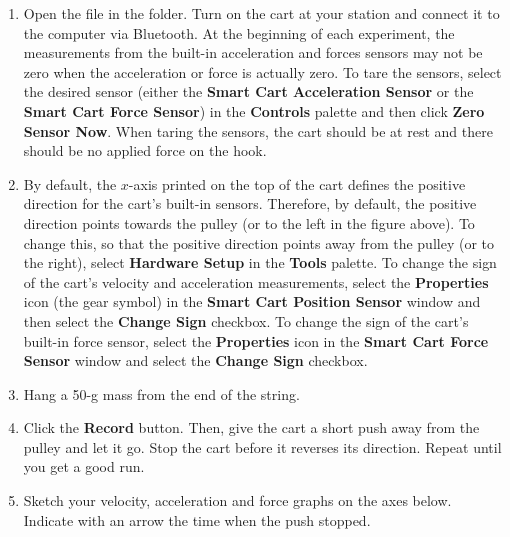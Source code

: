 \begin{enumerate}
\item Open the file  in the \filename{\coursefolder} folder. Turn on the cart at your station and connect it to the computer via Bluetooth. At the beginning of each experiment, the measurements from the built-in acceleration and forces sensors may not be zero when the acceleration or force is actually zero. To tare the sensors, select the desired sensor (either the \textbf{Smart Cart Acceleration Sensor} or the \textbf{Smart Cart Force Sensor}) in the \textbf{Controls} palette and then click \textbf{Zero Sensor Now}. When taring the sensors, the cart should be at rest and there should be no applied force on the hook.

\item By default, the $x$-axis printed on the top of the cart defines the positive direction for the cart's built-in sensors. Therefore, by default, the positive direction points towards the pulley (or to the left in the figure above). To change this, so that the positive direction points away from the pulley (or to the right), select \textbf{Hardware Setup} in the \textbf{Tools} palette. To change the sign of the cart's velocity and acceleration measurements, select the \textbf{Properties} icon (the gear symbol) in the \textbf{Smart Cart Position Sensor} window and then select the \textbf{Change Sign} checkbox. To change the sign of the cart's built-in force sensor, select the \textbf{Properties} icon in the \textbf{Smart Cart Force Sensor} window and select the \textbf{Change Sign} checkbox. 

\item Hang a 50-g mass from the end of the string.
 
\item Click the \textbf{Record} button. Then, give the cart a short push away from the pulley and let it go. Stop the cart before it reverses its direction. Repeat until you get a good run. 

\item Sketch your velocity, acceleration and force graphs on the axes below. 
Indicate with an arrow the time when the push
stopped.
\end{enumerate}

